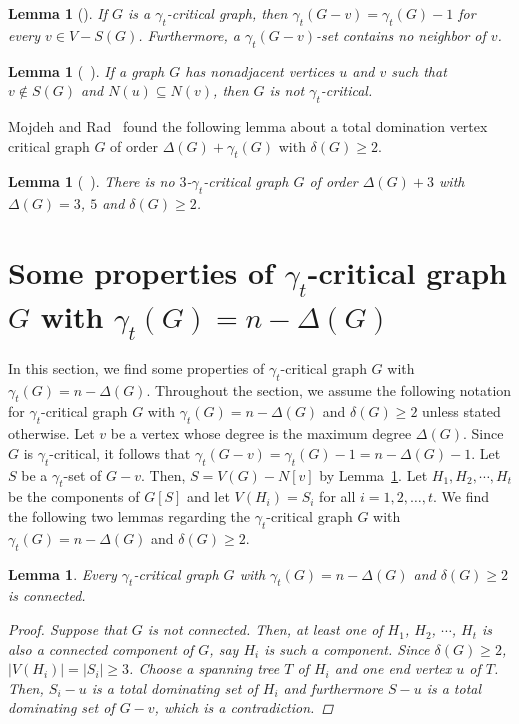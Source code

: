 \documentclass[12pt]{amsart}
\newtheorem{lem}[thm]{Lemma}
\begin{document}
\begin{lem} [\cite{GHHM}] \label{no-neighbor} If $G$ is a
$\gamma_{t}$-critical graph, then
$\gamma_{t}(G-v)=\gamma_{t}(G)-1$ for every $v\in V-S(G)$.
Furthermore, a $\gamma_{t}(G-v)$-set contains no neighbor of $v$. \label{lem1}
\end{lem}

\begin{lem} [~\cite{GHHM}] If a graph $G$ has
nonadjacent vertices $u$ and $v$ such that  $v\notin S(G)$ and $N(u)\subseteq N(v)$, then $G$ is not $\gamma_{t}$-critical. \label{lem2}
\end{lem}

Mojdeh and Rad~\cite{MR} found the following lemma about a total domination vertex
critical graph $G$ of order $\Delta(G)+\gamma_{t}(G)$ with
$\delta(G)\geq 2$.

\begin{lem} [~\cite{MR}] There is no $3$-$\gamma_{t}$-critical graph
$G$ of order $\Delta(G)+3$ with $\Delta(G)=3$, $5$ and $\delta(G)\geq
2$. \label{lem4}\end{lem}

\section{Some properties of $\gamma_{t}$-critical graph $G$ with $\gamma_{t}(G)=n-\Delta(G)$} \label{intro}

In this section, we find some properties of
$\gamma_{t}$-critical graph $G$ with $\gamma_{t}(G)=n-\Delta(G)$.
Throughout the section, we assume the following notation
for $\gamma_{t}$-critical graph $G$ with $\gamma_{t}(G)=n-\Delta(G)$ and $\delta(G) \ge 2$
unless stated otherwise. Let $v$ be a vertex whose degree
is the maximum degree $\Delta(G)$. Since $G$ is $\gamma_{t}$-critical, it
follows that $\gamma_{t}(G-v)=\gamma_{t}(G)-1=n-\Delta(G)-1$. Let
$S$ be a $\gamma_{t}$-set of $G - v$. Then, $S = V(G)-N[v]$  by
Lemma~\ref{no-neighbor}.
Let $H_{1},H_{2},\cdots, H_{t}$ be the
components of $G[S]$ and let $V(H_i) = S_i$ for all
$i=1,2,\ldots,t$.
We find the following two lemmas regarding
the $\gamma_{t}$-critical graph $G$ with $\gamma_{t}(G)=n-\Delta(G)$ and $\delta(G) \ge 2$.

\begin{lem} \label{connected} Every $\gamma_{t}$-critical graph $G$ with
$\gamma_{t}(G)=n-\Delta(G)$ and $\delta(G) \ge 2$ is connected.
\begin{proof}
Suppose that $G$ is not connected. Then, at least one of
$H_{1}$, $H_{2}$, $\cdots$, $H_{t}$ is also a connected component of $G$,
say $H_i$ is such a component. Since $\delta(G) \ge 2$, $|V(H_i )|
=|S_i | \ge 3$. Choose a spanning tree $T$ of $H_i$ and one
end vertex $u$ of $T$. Then, $S_i - u$ is a total dominating set
of $H_i$ and furthermore $S- u$ is a total dominating set of
$G-v$, which is a contradiction.
\end{proof}
 \end{lem}
\end{document}
